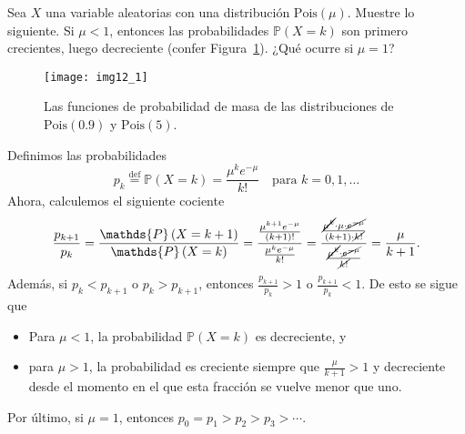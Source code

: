 \question

	Sea $X$ una variable aleatorias con una distribución $\mathrm{Pois}\left(\mu\right)$. Muestre lo siguiente. Si $\mu<1$, entonces las probabilidades $\mathds{P}\left(X=k\right)$ son primero crecientes, luego decreciente (confer Figura~\ref{fig:12_1}). ¿Qué ocurre si $\mu=1$?

	\begin{figure}[ht!]
		\centering
		\texttt{[image: img12\_1]}
		\caption{Las funciones de probabilidad de masa de las distribuciones de $\mathrm{Pois}\left(0.9\right)$ y $\mathrm{Pois}\left(5\right)$.}
		\label{fig:12_1}
	\end{figure}

	\begin{solutionordottedlines}
		Definimos las probabilidades
		\[
			p_{k}\stackrel{\text{def}}{=}\mathds{P}\left(X=k\right)=\frac{\mu^{k}e^{-\mu}}{k!}\quad\text{para } k=0,1,\ldots
		\]
		Ahora, calculemos el siguiente cociente
		\[
			\frac{p_{k+1}}{p_{k}}
			=\frac{\mathds{P}\left(X=k+1\right)}{\mathds{P}\left(X=k\right)}
			=\frac{\frac{\mu^{k+1}e^{-\mu}}{\left(k+1\right)!}}{\frac{\mu^{k}e^{-\mu}}{k!}}
			=\frac{\frac{\cancel{\mu^{k}}\cdot\mu\cdot \cancel{e^{-\mu}}}{\left(k+1\right)\cdot\cancel{ k!}}}{\frac{\cancel{\mu^{k}}\cdot\cancel{e^{-\mu}}}{\cancel{k!}}}
			=\frac{\mu}{k+1}.
		\]
		Además, si $p_{k}<p_{k+1}$ o $p_{k}>p_{k+1}$, entonces $\frac{p_{k+1}}{p_{k}}>1$ o $\frac{p_{k+1}}{p_{k}}<1$. De esto se sigue que
		\begin{itemize}
			\item Para $\mu<1$, la probabilidad $\mathds{P}\left(X=k\right)$ es decreciente, y
			\item para $\mu>1$, la probabilidad es creciente siempre que $\tfrac{\mu}{k+1}>1$ y decreciente desde el momento en el que esta fracción se vuelve menor que uno.
		\end{itemize}
		Por último, si $\mu={1}$, entonces $p_{0}=p_{1}>p_{2}>p_{3}>\cdots$.
	\end{solutionordottedlines}